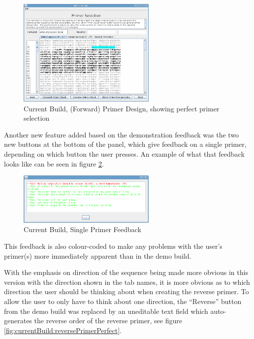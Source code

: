 \begin{figure}[!t]
  \begin{center}
    \includegraphics[width=0.6\textwidth]{./images/currentBuild/forwardPerfectPrimer.png}
    \caption{
      \label{fig:currentBuild:forwardPerfectPrimer}
      Current Build, (Forward) Primer Design, showing perfect primer selection
    }
  \end{center}
\end{figure}

Another new feature added based on the demonstration feedback was the
two new buttons at the bottom of the panel, which give feedback on a
single primer, depending on which button the user presses.
An example of what that feedback looks like can be seen in figure
\ref{fig:currentBuild:primerEvalRed}.

\begin{figure}[!t]
  \begin{center}
    \includegraphics[width=0.6\textwidth]{./images/currentBuild/primerEvalRed.png}
    \caption{
      \label{fig:currentBuild:primerEvalRed}
      Current Build, Single Primer Feedback
    }
  \end{center}
\end{figure}

This feedback is also colour-coded to make any problems with the
user's primer(s) more immediately apparent than in the demo build.

With the emphasis on direction of the sequence being made more obvious
in this version with the direction shown in the tab names, it is more
obvious as to which direction the user should be thinking about when
creating the reverse primer.
To allow the user to only have to think about one direction, the
``Reverse'' button from the demo build was replaced by an uneditable
text field which auto-generates the reverse order of the reverse
primer, see figure \ref{fig:currentBuild:reversePrimerPerfect}.

